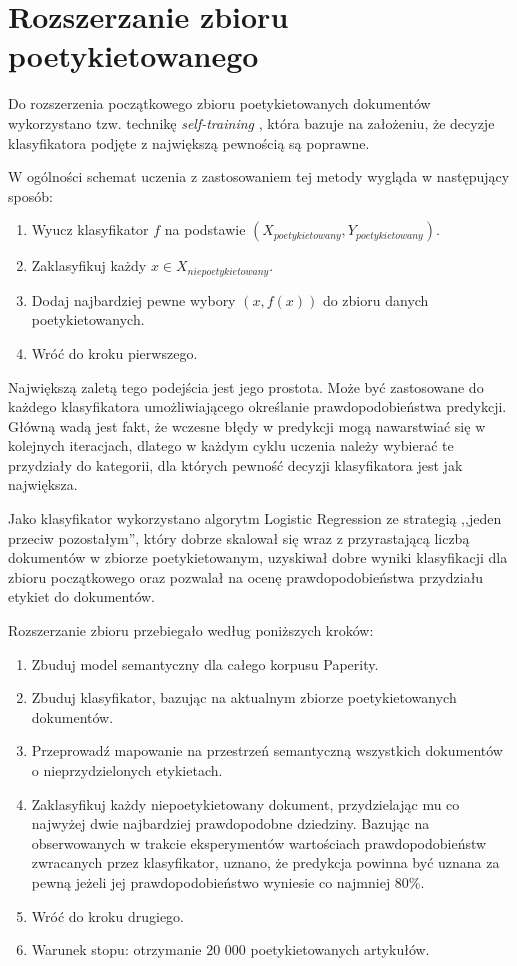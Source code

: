 \documentclass{pracamgr}
\begin{document}
\section{Rozszerzanie zbioru poetykietowanego}
Do rozszerzenia początkowego zbioru poetykietowanych dokumentów wykorzystano tzw. technikę \textit{self-training} \cite{chapelle}, która bazuje na założeniu, że decyzje klasyfikatora podjęte z największą pewnością są poprawne.

W ogólności schemat uczenia z zastosowaniem tej metody wygląda w następujący sposób:

\begin{enumerate}
    \item Wyucz klasyfikator $f$ na podstawie $(X_{poetykietowany}, Y_{poetykietowany})$.
    \item Zaklasyfikuj każdy $x \in X_{niepoetykietowany}$.
    \item Dodaj najbardziej pewne wybory $(x, f(x))$ do zbioru danych poetykietowanych.
    \item Wróć do kroku pierwszego.
\end{enumerate}

Największą zaletą tego podejścia jest jego prostota. Może być zastosowane do każdego klasyfikatora umożliwiającego określanie prawdopodobieństwa predykcji. Główną wadą jest fakt, że wczesne błędy w predykcji mogą nawarstwiać się w kolejnych iteracjach, dlatego w każdym cyklu uczenia należy wybierać te przydziały do kategorii, dla których pewność decyzji klasyfikatora jest jak największa.

Jako klasyfikator wykorzystano algorytm Logistic Regression ze strategią ,,jeden przeciw pozostałym'', który dobrze skalował się wraz z przyrastającą liczbą dokumentów w zbiorze poetykietowanym, uzyskiwał dobre wyniki klasyfikacji dla zbioru początkowego oraz pozwalał na ocenę prawdopodobieństwa przydziału etykiet do dokumentów. 

Rozszerzanie zbioru przebiegało według poniższych kroków:

\begin{enumerate}
    \item Zbuduj model semantyczny dla całego korpusu Paperity.
    \item Zbuduj klasyfikator, bazując na aktualnym zbiorze poetykietowanych dokumentów.
    \item Przeprowadź mapowanie na przestrzeń semantyczną wszystkich dokumentów o nieprzydzielonych etykietach.
    \item Zaklasyfikuj każdy niepoetykietowany dokument, przydzielając mu co najwyżej dwie najbardziej prawdopodobne dziedziny. Bazując na obserwowanych w trakcie eksperymentów wartościach prawdopodobieństw zwracanych przez klasyfikator, uznano, że predykcja powinna być uznana za pewną jeżeli jej prawdopodobieństwo wyniesie co najmniej 80\%.
    \item Wróć do kroku drugiego.
    \item Warunek stopu: otrzymanie 20 000 poetykietowanych artykułów.
\end{enumerate}
\end{document}
